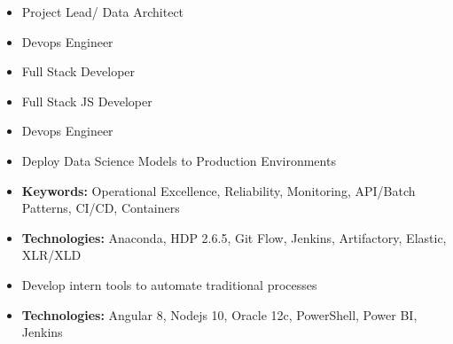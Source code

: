 \documentclass[10pt,a4paper,ragged2e]{altacv}
\begin{document}
\begin{paracol}{2}


\begin{itemize}
\item Project Lead/ Data Architect
\item Devops Engineer
\item Full Stack Developer
\end{itemize}

\divider

\begin{itemize}
\item Full Stack JS Developer
\item Devops Engineer
\end{itemize}


\begin{itemize}
\item Deploy Data Science Models to Production Environments
\item \textbf{Keywords:} Operational Excellence, Reliability, Monitoring, API/Batch Patterns, CI/CD, Containers
\item \textbf{Technologies:} Anaconda, HDP 2.6.5, Git Flow, Jenkins, Artifactory, Elastic, XLR/XLD
\end{itemize}

\divider

\begin{itemize}
\item Develop intern tools to automate traditional processes
\item \textbf{Technologies:} Angular 8, Nodejs 10, Oracle 12c, PowerShell, Power BI, Jenkins
\end{itemize}
\medskip


\end{paracol}
\end{document}
